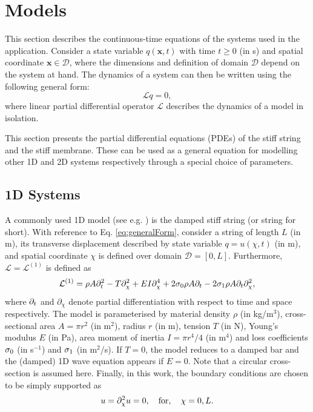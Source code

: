 \documentclass{article}
\begin{document}
\section{Models}\label{sec:models}
This section describes the continuous-time equations of the systems used in the application. Consider a state variable $q(\boldsymbol{x}, t)$ with time $t\geq 0$ (in s) and spatial coordinate $\boldsymbol{x}\in \mathcal{D}$, where the dimensions and definition of domain $\mathcal{D}$ depend on the system at hand. The dynamics of a system can then be written using the following general form:
\begin{equation}\label{eq:generalForm}
    \mathcal{L}q = 0,
\end{equation}
where linear partial differential operator $\mathcal{L}$ describes the dynamics of a model in isolation.

This section presents the partial differential equations (PDEs) of the stiff string and the stiff membrane. These can be used as a general equation for modelling other 1D and 2D systems respectively through a special choice of parameters. 


\subsection{1D Systems}
A commonly used 1D model (see e.g. \cite{Willemsen2019, Bilbao2019}) is the damped stiff string (or string for short). With reference to Eq. \eqref{eq:generalForm}, consider a string of length $L$ (in m), its transverse displacement described by state variable $q = u(\chi, t)$ (in m), and spatial coordinate $\chi$ is defined over domain $\mathcal{D} = [0, L]$. Furthermore, $\mathcal{L}=\mathcal{L}^{(\text{1})}$ is defined as \cite{Bensa2003}
\begin{equation}\label{eq:stiffString}
    \mathcal{L}^{(1)}= \rho A\partial_t^2 - T\partial_{\chi}^2 + E I \partial_{\chi}^4 + 2\sigma_{0}\rho A\partial_t - 2 \sigma_{1}\rho A\partial_t\partial_{\chi}^2,
\end{equation}
where $\partial_t$ and $\partial_\chi$ denote partial differentiation with respect to time and space respectively. The model is parameterised by material density $\rho$ (in kg/m$^3$), cross-sectional area $A = \pi r^2$ (in m$^2$), radius $r$ (in m), tension $T$ (in N), Young's modulus $E$ (in Pa), area moment of inertia $I = \pi r^4/4$ (in m$^4$) and loss coefficients $\sigma_{0}$ (in s$^{-1}$) and $\sigma_{1}$ (in m$^2$/s). If $T=0$, the model reduces to a damped bar and the (damped) 1D wave equation appears if $E = 0$. Note that a circular cross-section is assumed here. Finally, in this work, the boundary conditions are chosen to be simply supported as
\begin{equation}
    u = \partial_{\chi}^2 u = 0, \quad \text{for}, \quad \chi = 0, L.
\end{equation}
\end{document}

